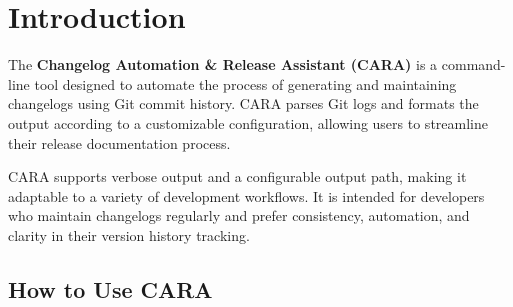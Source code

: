 \chapter{Introduction}
\label{ch:introduction}
\pagestyle{fancy}

The \textbf{Changelog Automation \& Release Assistant (CARA)} is a command-line tool designed to automate the process of generating and maintaining changelogs using Git commit history. CARA parses Git logs and formats the output according to a customizable configuration, allowing users to streamline their release documentation process.

CARA supports verbose output and a configurable output path, making it adaptable to a variety of development workflows. It is intended for developers who maintain changelogs regularly and prefer consistency, automation, and clarity in their version history tracking.


















\section{How to Use CARA}

